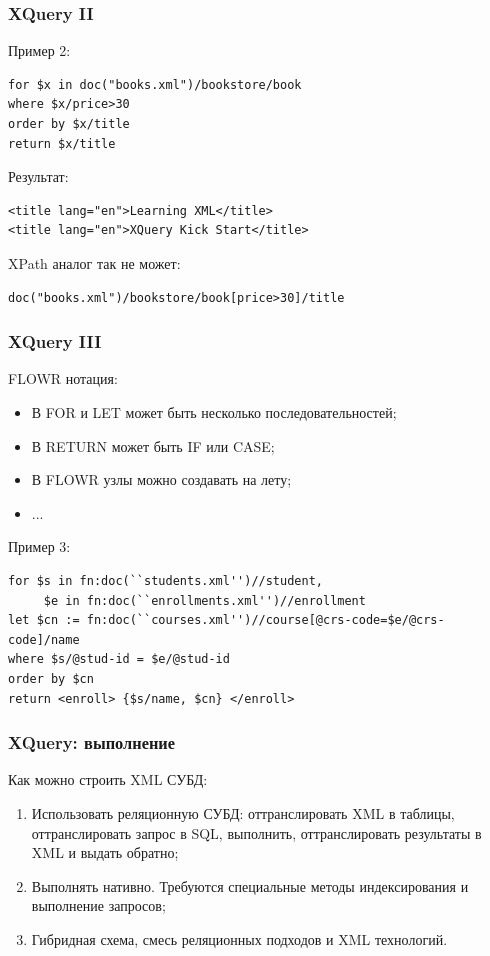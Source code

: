 \documentclass{beamer}
\begin{document}
\begin{frame}[fragile]
\frametitle{XQuery II}

Пример 2:
\lstset{language=XML} 
\begin{lstlisting}
for $x in doc("books.xml")/bookstore/book
where $x/price>30
order by $x/title
return $x/title 
\end{lstlisting}
Результат:
\begin{lstlisting}
<title lang="en">Learning XML</title> 
<title lang="en">XQuery Kick Start</title>
\end{lstlisting}
XPath аналог так не может:
\begin{lstlisting}
doc("books.xml")/bookstore/book[price>30]/title 
\end{lstlisting}


\end{frame}

\begin{frame}[fragile]
\frametitle{XQuery III}

FLOWR нотация:

\begin{itemize}
  \item В FOR и LET может быть несколько последовательностей;
  \item В RETURN может быть IF или CASE;
  \item В FLOWR узлы можно создавать на лету;
  \item ...
\end{itemize}

Пример 3:
\lstset{language=XML} 
\begin{lstlisting}
for $s in fn:doc(``students.xml'')//student,
     $e in fn:doc(``enrollments.xml'')//enrollment
let $cn := fn:doc(``courses.xml'')//course[@crs-code=$e/@crs-code]/name
where $s/@stud-id = $e/@stud-id
order by $cn
return <enroll> {$s/name, $cn} </enroll>
\end{lstlisting}


\end{frame}

\begin{frame}
\frametitle{XQuery: выполнение \cite{Grust2009}}

Как можно строить XML СУБД:

\begin{enumerate}
 \setlength\itemsep{1em}

  \item Использовать реляционную СУБД: оттранслировать XML в таблицы, оттранслировать запрос в SQL, выполнить, оттранслировать результаты в XML и выдать обратно;
  \item Выполнять нативно. Требуются специальные методы индексирования и выполнение запросов;
  \item Гибридная схема, смесь реляционных подходов и XML технологий.
\end{enumerate}

\end{frame}
\end{document}
